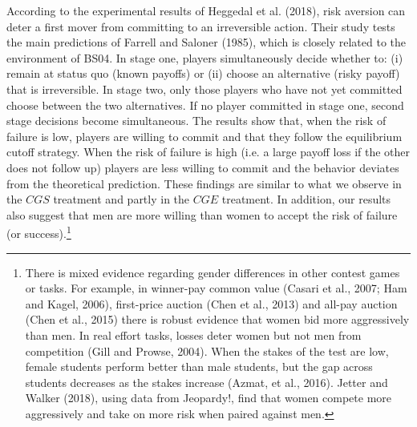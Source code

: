 \documentclass[11pt, letterpaper]{article}
\theoremstyle{plain}
\begin{document}
According to the experimental results of Heggedal et al. (2018), risk aversion can deter a first mover from committing to an irreversible action. Their study tests the main predictions of Farrell and Saloner (1985), which is closely related to the environment of BS04. In stage one, players simultaneously decide whether to: (i) remain at status quo (known payoffs) or (ii) choose an alternative (risky payoff) that is irreversible. In stage two, only those players who have not yet committed choose between the two alternatives. If no player committed in stage one, second stage decisions become simultaneous. The results show that, when the risk of failure is low, players are willing to commit and that they follow the equilibrium cutoff strategy. When the risk of failure is high (i.e. a large payoff loss if the other does not follow up) players are less willing to commit and the behavior deviates from the theoretical prediction. These findings are similar to what we observe in the $CGS$ treatment and partly in the $CGE$ treatment. In addition, our results also suggest that men are more willing than women to accept the risk of failure (or success).\footnote{There is  mixed evidence regarding gender differences in other contest games or tasks. For example, in winner-pay common value (Casari et al., 2007; Ham and Kagel, 2006), first-price auction (Chen et al., 2013) and all-pay auction (Chen et al., 2015) there is robust evidence that women bid more aggressively than men. In real effort tasks, losses deter women but not men from competition (Gill and Prowse, 2004). When the stakes of the test are low, female students perform better than male students, but the gap across students decreases as the stakes increase (Azmat, et al., 2016). Jetter and Walker (2018), using data from Jeopardy!, find that women compete more aggressively and take on more risk when paired against men.} 
\end{document}
